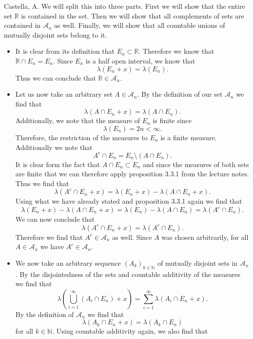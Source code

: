 \begin{solution}[3.19]{Castella, A.}
    We will split this into three parts. First we will show that the entire set $\mathbb{R}$ is contained in the set. Then we will show that all complements of sets are contained in $\mathcal{A}_n$ as well. Finally, we will show that all countable unions of mutually disjoint sets belong to it.
    \begin{itemize}
        \item It is clear from its definition that $E_n \subset \mathbb{R}$. Therefore we know that $\mathbb{R}\cap E_n = E_n$. Since $E_n$ is a half open interval, we know that
        $$
            \lambda(E_n + x) = \lambda(E_n).
        $$
        Thus we can conclude that $\mathbb{R} \in \mathcal{A}_n$.
        \item Let us now take an arbitrary set $A \in \mathcal{A}_n$. By the definition of our set $\mathcal{A}_n$ we find that
        $$
            \lambda(A\cap E_n + x) = \lambda(A\cap E_n).
        $$
        Additionally, we note that the measure of $E_n$ is finite since
        $$
            \lambda(E_n) = 2n < \infty.
        $$
        Therefore, the restriction of the measures to $E_n$ is a finite measure. Additionally we note that
        $$
            A^c\cap E_n = E_n\setminus(A\cap E_n).
        $$
        It is clear form the fact that $A\cap E_n \subset E_n$ and since the measures of both sets are finite that we can therefore apply proposition 3.3.1 from the lecture notes. Thus we find that
        $$
            \lambda(A^c\cap E_n + x) = \lambda(E_n + x) - \lambda(A\cap E_n + x).
        $$
        Using what we have already stated and proposition 3.3.1 again we find that
        $$
            \lambda(E_n + x) - \lambda(A\cap E_n + x) = \lambda(E_n) - \lambda(A\cap E_n) = \lambda(A^c\cap E_n).
        $$
        We can now conclude that
        $$
            \lambda(A^c\cap E_n + x) = \lambda(A^c\cap E_n).
        $$
        Therefore we find that $A^c \in \mathcal{A}_n$ as well. Since $A$ was chosen arbitrarily, for all $A \in \mathcal{A}_n$ we have $A^c \in \mathcal{A}_n$.
        \item We now take an arbitrary sequence $(A_k)_{k\in\mathbb{N}}$ of mutually disjoint sets in $\mathcal{A}_n$. By the disjointedness of the sets and countable additivity of the measures we find that
        $$
            \lambda\left(\bigcup_{i=1}^\infty (A_i\cap E_n) + x\right) = \sum_{i=1}^\infty \lambda(A_i\cap E_n + x).
        $$
        By the definition of $\mathcal{A}_n$ we find that
        $$
            \lambda(A_k \cap E_n + x) = \lambda(A_k \cap E_n)
        $$
        for all $k\in \mathbb{N}$. Using countable additivity again, we also find that

\end{itemize}
\end{solution}
